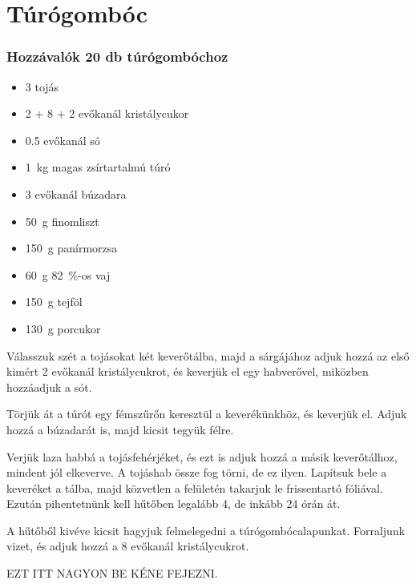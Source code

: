 \newpage
\section*{Túrógombóc} \label{sec:turogomboc}

\subsubsection*{Hozzávalók 20 db túrógombóchoz}
\begin{itemize}
    \item \num{3} tojás
    \item \num{2} + \num{8} + \num{2} evőkanál kristálycukor
    \item \num{0.5} evőkanál só
    \item \qty{1}{\kg} magas zsírtartalmú túró
    \item \num{3} evőkanál búzadara
    \item \qty{50}{\g} finomliszt
    \item \qty{150}{\g} panírmorzsa
    \item \qty{60}{\g} \qty{82}{\percent}-os vaj
    \item \qty{150}{\g} tejföl
    \item \qty{130}{\g} porcukor
\end{itemize}

Válasszuk szét a tojásokat két keverőtálba, majd a sárgájához adjuk hozzá az első kimért \num{2} evőkanál kristálycukrot, és keverjük el egy habverővel, miközben hozzáadjuk a sót.

Törjük át a túrót egy fémszűrőn keresztül a keverékünkhöz, és keverjük el. Adjuk hozzá a búzadarát is, majd kicsit tegyük félre.

Verjük laza habbá a tojásfehérjéket, és ezt is adjuk hozzá a másik keverőtálhoz, mindent jól elkeverve. A tojáshab össze fog törni, de ez ilyen. Lapítsuk bele a keveréket a tálba, majd közvetlen a felületén takarjuk le frissentartó fóliával. Ezután pihentetnünk kell hűtőben legalább \num{4}, de inkább \num{24} órán át.

A hűtőből kivéve kicsit hagyjuk felmelegedni a túrógombócalapunkat. Forraljunk vizet, és adjuk hozzá a \num{8} evőkanál kristálycukrot.

EZT ITT NAGYON BE KÉNE FEJEZNI.